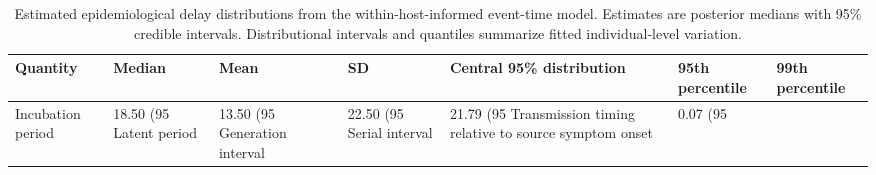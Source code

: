 \begin{table}[ht]
\centering
\caption{Estimated epidemiological delay distributions from the within-host-informed event-time model. Estimates are posterior medians with 95\% credible intervals. Distributional intervals and quantiles summarize fitted individual-level variation.}
\begin{tabular}{lllllll}
\hline
Quantity & Median & Mean & SD & Central 95\% distribution & 95th percentile & 99th percentile \\
\hline
Incubation period & 18.50 (95%
Latent period & 13.50 (95%
Generation interval & 22.50 (95%
Serial interval & 21.79 (95%
Transmission timing relative to source symptom onset & 0.07 (95%
\hline
\end{tabular}
\end{table}
